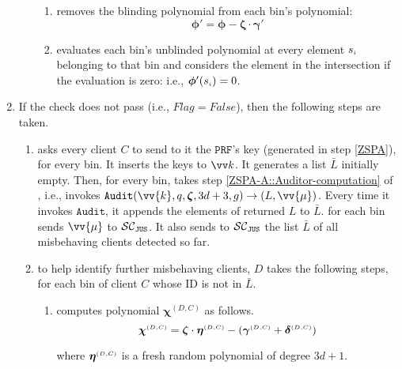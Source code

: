 \begin{enumerate}
\begin{enumerate}
\begin{enumerate}
  \item removes the blinding polynomial from each bin's polynomial: 
  $$\bm\phi'=\bm\phi-\bm\zeta\cdot \bm\gamma'$$ 
  
  \item\label{F-PSI::find-intersection} evaluates each bin's unblinded polynomial at every element $s_{\scriptscriptstyle i}$ belonging to that bin and considers the element in the intersection if the evaluation is zero: i.e., $\bm\phi'(s_{\scriptscriptstyle i})=0$.
 
 \end{enumerate}
 
 
 \end{enumerate}
 
 \item\label{F-PSI::flag-is-false} If the check does not pass (i.e., $Flag=False$), then the following steps are taken.
 
 

 
 \begin{enumerate}
 

 \item\label{auditor}  \aud asks every client $    {  C}$ to send to it the  $\mathtt{PRF}$'s key (generated in step \ref{ZSPA}), for every bin. It inserts the keys to $\vv k$.  It generates a list $\bar L$ initially empty. Then, for every bin,  \aud takes step \ref{ZSPA-A::Auditor-computation} of \zspaa, i.e., invokes  $\mathtt{Audit}( \vv{{k}},  q, \bm\zeta, 3d+3, g)\rightarrow (L, \vv{{\mu}})$.  Every time it invokes $\mathtt{Audit}$, it appends the elements of returned $L$ to $\bar L$.  \aud for each bin sends  $ \vv{{\mu}}$ to $\mathcal{SC}_{\mathtt{JUS}}$. It also sends  to $\mathcal{SC}_{\mathtt{JUS}}$ the list $\bar L$ of all misbehaving clients detected so far.
 

 
 \item to  help identify further  misbehaving clients, $D$ takes the following steps,  for each bin of client $    {  C}$ whose ID is not in $\bar L$.   
 \begin{enumerate}
 \item\label{gen-unmaking-poly} computes polynomial $\bm\chi^{  {  {(D, C)}}}$ as follows. 
 $$\bm\chi^{ \scriptscriptstyle {  {(D, C)}}}=\bm\zeta\cdot \bm\eta^{ \scriptscriptstyle {  {(D,C)}}}-(\bm\gamma^{ \scriptscriptstyle {  {(D,C)}}}+\bm\delta^{ \scriptscriptstyle {  {(D,C)}}})$$
 
 
  where $\bm\eta^{ \scriptscriptstyle {  {(D,C)}}}$ is a fresh random polynomial of degree $3d+1$. 
  

\end{enumerate}
\end{enumerate}
\end{enumerate}
